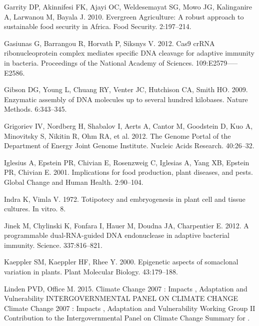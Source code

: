 \documentclass[
]{article}
\newlength{\cslhangindent}
\newenvironment{CSLReferences}[2] %
 {%
  \setlength{\parindent}{0pt}
  \ifodd #1 \everypar{\setlength{\hangindent}{\cslhangindent}}\ignorespaces\fi
  \ifnum #2 > 0
  \setlength{\parskip}{#2\baselineskip}
  \fi
 }%
 {}
\begin{document}
\begin{CSLReferences}{0}{0}
\leavevmode{}%
Garrity DP, Akinnifesi FK, Ajayi OC, Weldesemayat SG, Mowo JG,
Kalinganire A, Larwanou M, Bayala J. 2010. {Evergreen Agriculture: A
robust approach to sustainable food security in Africa}. Food Security.
2:197--214.

\leavevmode{}%
Gasiunas G, Barrangou R, Horvath P, Siksnys V. 2012. {Cas9 crRNA
ribonucleoprotein complex mediates specific DNA cleavage for adaptive
immunity in bacteria}. Proceedings of the National Academy of Sciences.
109:E2579-----E2586.

\leavevmode{}%
Gibson DG, Young L, Chuang RY, Venter JC, Hutchison CA, Smith HO. 2009.
{Enzymatic assembly of DNA molecules up to several hundred kilobases}.
Nature Methods. 6:343--345.

\leavevmode{}%
Grigoriev IV, Nordberg H, Shabalov I, Aerts A, Cantor M, Goodstein D,
Kuo A, Minovitsky S, Nikitin R, Ohm RA, et al. 2012. {The Genome Portal
of the Department of Energy Joint Genome Institute}. Nucleic Acids
Research. 40:26--32.

\leavevmode{}%
Iglesius A, Epstein PR, Chivian E, Rosenzweig C, Iglesias A, Yang XB,
Epstein PR, Chivian E. 2001. {Implications for food production, plant
diseases, and pests}. Global Change and Human Health. 2:90--104.

\leavevmode{}%
Indra K, Vimla V. 1972. {Totipotecy and embryogenesis in plant cell and
tissue cultures}. In vitro. 8.

\leavevmode{}%
Jinek M, Chylinski K, Fonfara I, Hauer M, Doudna JA, Charpentier E.
2012. {A programmable dual-RNA-guided DNA endonuclease in adaptive
bacterial immunity}. Science. 337:816--821.

\leavevmode{}%
Kaeppler SM, Kaeppler HF, Rhee Y. 2000. {Epigenetic aspects of
somaclonal variation in plants}. Plant Molecular Biology. 43:179--188.

\leavevmode{}%
Linden PVD, Office M. 2015. {Climate Change 2007 : Impacts , Adaptation
and Vulnerability INTERGOVERNMENTAL PANEL ON CLIMATE CHANGE Climate
Change 2007 : Impacts , Adaptation and Vulnerability Working Group II
Contribution to the Intergovernmental Panel on Climate Change Summary
for }.


\end{CSLReferences}
\end{document}
